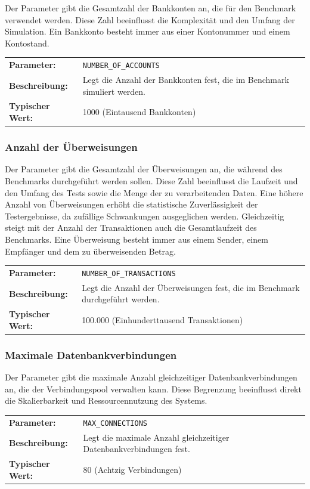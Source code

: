 \documentclass[fontsize=12pt,paper=a4,twoside=semi,parskip=half-,headsepline,headinclude]{scrreprt}
\begin{document}
Der Parameter gibt die Gesamtzahl der Bankkonten an, die für den Benchmark verwendet werden. Diese Zahl beeinflusst die Komplexität und den Umfang der Simulation. Ein Bankkonto besteht immer aus einer Kontonummer und einem Kontostand.

\begin{tabularx}{\textwidth}{@{}lX@{}}
	\textbf{Parameter:} & \texttt{NUMBER\_OF\_ACCOUNTS} \\
	\textbf{Beschreibung:} & Legt die Anzahl der Bankkonten fest, die im Benchmark simuliert werden. \\
	\textbf{Typischer Wert:} & 1000 (Eintausend Bankkonten)
\end{tabularx}

\subsubsection{Anzahl der Überweisungen}

Der Parameter gibt die Gesamtzahl der Überweisungen an, die während des Benchmarks durchgeführt werden sollen. Diese Zahl beeinflusst die Laufzeit und den Umfang des Tests sowie die Menge der zu verarbeitenden Daten. Eine höhere Anzahl von Überweisungen erhöht die statistische Zuverlässigkeit der Testergebnisse, da zufällige Schwankungen ausgeglichen werden. Gleichzeitig steigt mit der Anzahl der Transaktionen auch die Gesamtlaufzeit des Benchmarks. Eine Überweisung besteht immer aus einem Sender, einem Empfänger und dem zu überweisenden Betrag. 

\begin{tabularx}{\textwidth}{@{}lX@{}}
	\textbf{Parameter:} & \texttt{NUMBER\_OF\_TRANSACTIONS} \\
	\textbf{Beschreibung:} & Legt die Anzahl der Überweisungen fest, die im Benchmark durchgeführt werden. \\
	\textbf{Typischer Wert:} & 100.000 (Einhunderttausend Transaktionen)
\end{tabularx}

\subsubsection{Maximale Datenbankverbindungen}

Der Parameter gibt die maximale Anzahl gleichzeitiger Datenbankverbindungen an, die der Verbindungspool verwalten kann. Diese Begrenzung beeinflusst direkt die Skalierbarkeit und Ressourcennutzung des Systems.

\begin{tabularx}{\textwidth}{@{}lX@{}}
	\textbf{Parameter:} & \texttt{MAX\_CONNECTIONS} \\
	\textbf{Beschreibung:} & Legt die maximale Anzahl gleichzeitiger Datenbankverbindungen fest. \\
	\textbf{Typischer Wert:} & 80 (Achtzig Verbindungen)
\end{tabularx}
\end{document}
